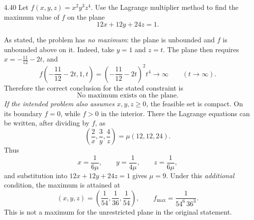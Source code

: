\documentclass[11pt,oneside]{article}
\begin{document}
\begin{problem}{4.40}
Let $f(x,y,z)=x^2y^3z^4$. Use the Lagrange multiplier method
to find the maximum value of $f$ on the plane
\[
 12x+12y+24z=1.
\]
\end{problem}
\begin{solution}
As stated, the problem has \emph{no maximum}: the plane is unbounded
and $f$ is unbounded above on it. Indeed, take $y=1$ and $z=t$.
The plane then requires $x=-\frac{11}{12}-2t$, and
\[
 f\left(-\frac{11}{12}-2t,1,t\right)
 =\left(-\frac{11}{12}-2t\right)^2t^4
 \longrightarrow\infty\qquad(t\to\infty).
\]
Therefore the correct conclusion for the stated constraint is
\[
 \boxed{\text{No maximum exists on the plane.}}
\]
\emph{If the intended problem also assumes $x,y,z\ge0$,}
the feasible set is compact. On its boundary $f=0$, while
$f>0$ in the interior. There the Lagrange equations can be
written, after dividing by $f$, as
\[
 \left(\frac2x,\frac3y,\frac4z\right)
 =\mu(12,12,24).
\]
Thus
\[
 x=\frac1{6\mu},\qquad y=\frac1{4\mu},
 \qquad z=\frac1{6\mu},
\]
and substitution into $12x+12y+24z=1$ gives $\mu=9$.
Under this \emph{additional} condition, the maximum is attained at
\[
 \boxed{(x,y,z)=\left(\frac1{54},\frac1{36},\frac1{54}\right)},
 \qquad
 \boxed{f_{\max}=\frac1{54^6\,36^3}}.
\]
This is not a maximum for the unrestricted plane in the original statement.
\end{solution}
\end{document}

